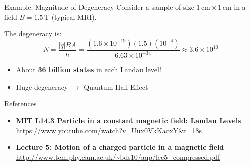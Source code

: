 \documentclass[aspectratio=169, 14pt, t]{beamer}
\begin{document}
\begin{frame}{Example: Magnitude of Degeneracy}
    Consider a sample of size $1\,\text{cm} \times 1\,\text{cm}$ in a field $B = 1.5\,\text{T}$ (typical MRI).
    \vspace{0.3cm}
    
    The degeneracy is:
    \[
        N = \frac{|q|B A}{h} = \frac{(1.6 \times 10^{-19})(1.5)(10^{-4})}{6.63 \times 10^{-34}} \approx 3.6 \times 10^{10}
    \]
    \vspace{0.3cm}
    \begin{itemize}
        \item About \textbf{36 billion states} in each Landau level!
        \item Huge degeneracy $\rightarrow$ Quantum Hall Effect
    \end{itemize}
\end{frame}


\begin{frame}{References}
    \begin{itemize}
        \normalsize
        \item \textbf{MIT L14.3 Particle in a constant magnetic field: Landau Levels} \\
        \small \url{https://www.youtube.com/watch?v=Uux0VkKaoxY&t=18s}
        \vspace{0.2cm}
        \normalsize
        \item \textbf{Lecture 5: Motion of a charged particle in a magnetic field} \\
        \small \url{http://www.tcm.phy.cam.ac.uk/~bds10/aqp/lec5_compressed.pdf}
    \end{itemize}
\end{frame}


\appendix
\end{document}
